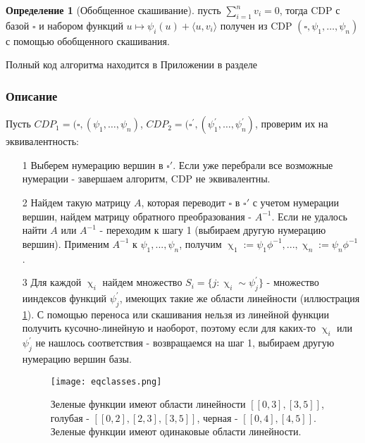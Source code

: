\documentclass[fontsize=14pt]{scrartcl}
\theoremstyle{definition}
\newtheorem{definition}{Определение}[section]
\begin{document}
\begin{definition}[Обобщенное скашивание]
пусть $\sum_{i=1}^n v_i = 0$, тогда CDP с базой $\square$ и набором функций $u \mapsto \psi_i(u) + \langle u, v_i \rangle$ получен из CDP $(\square, \psi_1, \dots, \psi_n)$ с помощью обобщенного скашивания.
\end{definition}

Полный код алгоритма находится в Приложении в разделе \pageref{cdppy}


\subsubsection{Описание}

Пусть $CDP_1 = (\square, (\psi_1, \dots, \psi_n)$, $CDP_2 = (\square^{'}, (\psi^{'}_1, \dots, \psi^{'}_n)$, проверим их на эквивалентность:
\begin{itemize}
\item[1] Выберем нумерацию вершин в $\square'$. Если уже перебрали все возможные нумерации	- завершаем алгоритм, CDP не эквивалентны.
\item[2] Найдем такую матрицу $A$, которая переводит $\square$ в $\square'$ с учетом нумерации вершин, найдем матрицу обратного преобразования - $A^{-1}$. Если не удалось найти $A$ или $A^{-1}$ - переходим к шагу 1 (выбираем другую нумерацию вершин). Применим $A^{-1}$ к $\psi_1, ..., \psi_n$, получим $\upchi_1 := \psi_1\phi^{-1}, ..., \upchi_n := \psi_n\phi^{-1}$.
\item[3] Для каждой $\upchi_i$ найдем множество $S_i = \{j: \upchi_i \sim \psi^{'}_j\}$ - множество ииндексов функций $\psi^{'}_j$, имеющих такие же области линейности (иллюстрация \ref{eqclasses}). С помощью переноса или скашивания нельзя из линейной функции получить кусочно-линейную и наоборот, поэтому если для каких-то $\upchi_i$ или $\psi^{'}_j$ не нашлось соответствия - возвращаемся на шаг 1, выбираем другую нумерацию вершин базы.
\begin{figure}[!htb]
\centering
  \texttt{[image: eqclasses.png]}
  \caption{Зеленые функции имеют области линейности $[[0, 3], [3, 5]]$, голубая - $[[0, 2], [2, 3], [3, 5]]$, черная - $[[0, 4], [4, 5]]$. Зеленые функции имеют одинаковые области линейности.}\label{eqclasses}
\end{figure}


\end{itemize}
\end{document}
